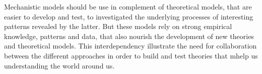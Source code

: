 Mechanistic models should be use in complement of theoretical models, that are easier to develop and test, to investigated the underlying processes of interesting patterns revealed by the latter. But these models rely on strong empirical knowledge, patterns and data, that also nourish the development of new theories and theoretical models. This interdependency illustrate the need for collaboration between the different approaches in order to build and test theories that mhelp us understanding the world around us.

%
%
%
%
%
%
%
